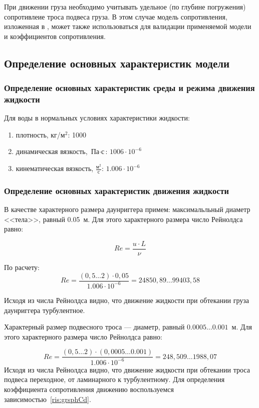 \documentclass[russian,utf8, pointsubsection]{eskdtext}
\begin{document}
При движении груза необходимо учитывать удельное (по глубине погружения) сопротивлеие троса подвеса груза. В этом случае модель сопротивления, изложенная в \cite{cylInFlow}, может также использоваться для валидации применяемой модели и коэффициентов сопротивления. 


\subsection{Определение основных характеристик модели}

\subsubsection{Определение основных характеристик среды и режима движения жидкости}
Для воды в нормальных условиях характеристики жидкости:
\begin{enumerate}
\item плотность, кг/м$^2$: 1000
\item динамическая вязкость, $\text{Па}\cdot\text{с}$\cite{waterProps}: $1006\cdot10^{-6}$ 
\item кинематическая вязкость, $\frac{\text{м}^2}{\text{с}}$\cite{waterProps}: $1.006\cdot10^{-6}$
\end{enumerate}

\subsubsection{Определение основных характеристик движения жидкости}
\pointsubsubsection В качестве характерного размера даунриггера примем:
максимальльный диаметр <<тела>>, равный 0.05~м. 
Для этого характерного размера число Рейнолдса равно:

\begin{equation}
Re = \frac{u\cdot{L}}{\nu} 
\end{equation}

По расчету:
\begin{equation}
Re = \frac{(0,5\dots2)\cdot{0,05}}{1.006\cdot10^{-6}}=24850,89\dots99403,58
\end{equation}

Исходя из числа Рейнолдса видно, что движение жидкости при обтекании груза даунриггера турбулентное.

Характерный размер подвесного троса --- диаметр, равный $0.0005\dots0.001$~м. Для этого характерного размера число Рейнолдса равно:

\begin{equation}
Re = \frac{(0,5\dots2)\cdot{(0,0005\dots0.001)}}{1.006\cdot10^{-6}}=248,509\dots1988,07
\end{equation}
\pointsubsubsection Исходя из числа Рейнолдса видно, что движение жидкости при обтекании троса подвеса переходное, от ламинарного к турбулентному. Для определения коэффициента сопротивления движению воспользуемся зависимостью~\ref{ris:grsphCd}.
\end{document}

